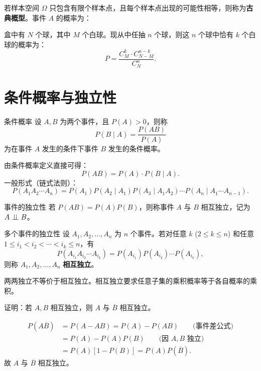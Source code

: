 若样本空间 $\Omega$ 只包含有限个样本点，且每个样本点出现的可能性相等，则称为\textbf{古典概型}。事件 $A$ 的概率为：
\begin{myformula}
\end{myformula}

\begin{example}[古典概型抽球公式]
盒中有 $N$ 个球，其中 $M$ 个白球。现从中任抽 $n$ 个球，则这 $n$ 个球中恰有 $k$ 个白球的概率为：
\[P = \frac{C_M^k \cdot C_{N-M}^{n-k}}{C_N^n}.\]
\end{example}

\section{条件概率与独立性}

\begin{mydefinition}{条件概率}
	设 $A, B$ 为两个事件，且 $P(A) > 0$，则称
	\[P(B \mid A) = \frac{P(AB)}{P(A)}\]
	为在事件 $A$ 发生的条件下事件 $B$ 发生的条件概率。
\end{mydefinition}

\begin{theorem}[乘法公式与链式法则]
由条件概率定义直接可得：
\[P(AB) = P(A) \cdot P(B \mid A).\]
一般形式（链式法则）：
\[P(A_1 A_2 \cdots A_n) = P(A_1) P(A_2 \mid A_1) P(A_3 \mid A_1 A_2) \cdots P(A_n \mid A_1 \cdots A_{n-1}).\]
\end{theorem}

\begin{mydefinition}{事件的独立性}
	若 $P(AB) = P(A) P(B)$，则称事件 $A$ 与 $B$ 相互独立，记为 $A \perp\!\!\!\perp B$。
\end{mydefinition}

\begin{mydefinition}{多个事件的独立性}
	设 $A_1, A_2, \ldots, A_n$ 为 $n$ 个事件。若对任意 $k$ ($2 \leq k \leq n$) 和任意 $1 \leq i_1 < i_2 < \cdots < i_k \leq n$，有
	\[P(A_{i_1} A_{i_2} \cdots A_{i_k}) = P(A_{i_1}) P(A_{i_2}) \cdots P(A_{i_k}),\]
	则称 $A_1, A_2, \ldots, A_n$ \textbf{相互独立}。
\end{mydefinition}

\begin{remark}
	两两独立不等价于相互独立。相互独立要求任意子集的乘积概率等于各自概率的乘积。
\end{remark}

\begin{example}[独立性证明]
证明：若 $A, B$ 相互独立，则 $A$ 与 $\overline{B}$ 相互独立。

\begin{solution}
\begin{align*}
P(A\overline{B}) &= P(A - AB) = P(A) - P(AB) \qquad\text{(事件差公式)}\\
&= P(A) - P(A)P(B) \qquad\text{(因 $A, B$ 独立)}\\
&= P(A)[1 - P(B)] = P(A)P(\overline{B}).
\end{align*}
故 $A$ 与 $\overline{B}$ 相互独立。
\end{solution}
\end{example}

